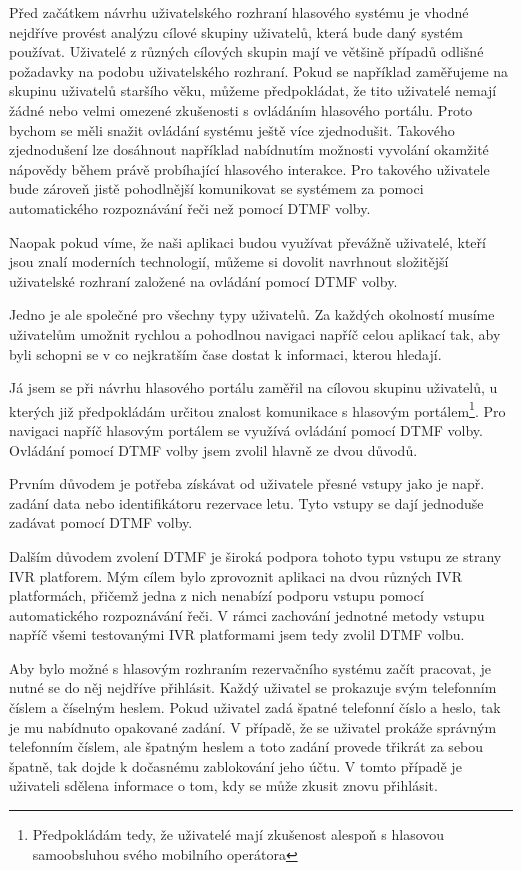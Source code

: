 \documentclass[ing,male,java,dept460,twoside]{diploma}						%
\begin{document}
Před začátkem návrhu uživatelského rozhraní hlasového systému je vhodné nejdříve provést analýzu cílové skupiny uživatelů, která bude daný systém používat. Uživatelé z různých cílových skupin mají ve většině případů odlišné požadavky na podobu uživatelského rozhraní. Pokud se například zaměřujeme na skupinu uživatelů staršího věku, můžeme předpokládat, že tito uživatelé nemají žádné nebo velmi omezené zkušenosti s ovládáním hlasového portálu. Proto bychom se měli snažit ovládání systému ještě více zjednodušit. Takového zjednodušení lze dosáhnout například nabídnutím možnosti vyvolání okamžité nápovědy během právě probíhající hlasového interakce. Pro takového uživatele bude zároveň jistě pohodlnější komunikovat se systémem za pomoci automatického rozpoznávání řeči než pomocí DTMF volby.

Naopak pokud víme, že naši aplikaci budou využívat převážně uživatelé, kteří jsou znalí moderních technologií, můžeme si dovolit navrhnout složitější uživatelské rozhraní založené na ovládání pomocí DTMF volby.

Jedno je ale společné pro všechny typy uživatelů. Za každých okolností musíme uživatelům umožnit rychlou a pohodlnou navigaci napříč celou aplikací tak, aby byli schopni se v co nejkratším čase dostat k informaci, kterou hledají.

Já jsem se při návrhu hlasového portálu zaměřil na cílovou skupinu uživatelů, u kterých již předpokládám určitou znalost komunikace s hlasovým portálem\footnote{Předpokládám tedy, že uživatelé mají zkušenost alespoň s hlasovou samoobsluhou svého mobilního operátora}. Pro navigaci napříč hlasovým portálem se využívá ovládání pomocí DTMF volby. Ovládání pomocí DTMF volby jsem zvolil hlavně ze dvou důvodů.

Prvním důvodem je potřeba získávat od uživatele přesné vstupy jako je např. zadání data nebo identifikátoru rezervace letu. Tyto vstupy se dají jednoduše zadávat pomocí DTMF volby.

Dalším důvodem zvolení DTMF je široká podpora tohoto typu vstupu ze strany IVR platforem. Mým cílem bylo zprovoznit aplikaci na dvou různých IVR platformách, přičemž jedna z nich nenabízí podporu vstupu pomocí automatického rozpoznávání řeči. V rámci zachování jednotné metody vstupu napříč všemi testovanými IVR platformami jsem tedy zvolil DTMF volbu.

Aby bylo možné s hlasovým rozhraním rezervačního systému začít pracovat, je nutné se do něj nejdříve přihlásit. Každý uživatel se prokazuje svým telefonním číslem a číselným heslem. Pokud uživatel zadá špatné telefonní číslo a heslo, tak je mu nabídnuto opakované zadání. V případě, že se uživatel prokáže správným telefonním číslem, ale špatným heslem a toto zadání provede třikrát za sebou špatně, tak dojde k dočasnému zablokování jeho účtu. V tomto případě je uživateli sdělena informace o tom, kdy se může zkusit znovu přihlásit.
\end{document}
